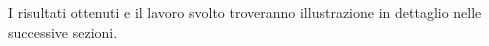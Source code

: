 I risultati ottenuti e il lavoro svolto troveranno illustrazione in dettaglio nelle successive sezioni.  




